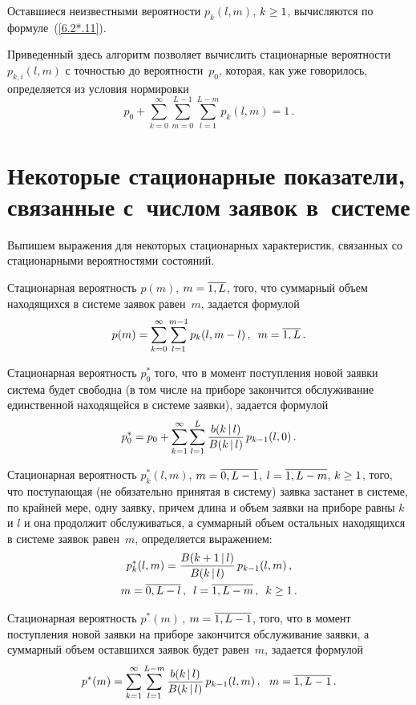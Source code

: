 \begin{multicols}{2}
Оставшиеся неизвестными вероятности $p_{k}(l,m)$,
$k\hm\ge1$, вычисляются по формуле~(\ref{6.2*.11}).

Приведенный здесь алгоритм позволяет вы\-чис\-лить
стационарные вероятности $p_{k,i}(l,m)$ с точ\-ностью
до вероятности~$p_0$, которая, как уже говорилось,
определяется из условия нормировки
$$
p_0+ \sum\limits_{k=0}^{\infty} \sum\limits_{m=0}^{L-1}
\sum\limits_{l=1}^{L-m} p_{k}(l,m)
= 1 \,.
$$

\section{Некоторые стационарные показатели,
связанные с~числом заявок в~системе}

Выпишем выражения для некоторых стационарных
характеристик, связанных со стационарными
вероятностями со\-сто\-яний.

Стационарная вероятность $p(m)$, $m\hm= \overline{1,L}$,
того, что суммарный объем находящихся в сис\-те\-ме заявок
равен~$m$, задается формулой
\begin{equation*}
p(m)= \sum\limits_{k=0}^{\infty} \sum\limits_{l=1}^{m-1}
p_{k}(l,m-l)\,,
\enskip m= \overline{1,L}\,.
\end{equation*}

Стационарная вероятность $p^*_{0}$ того, что в момент
поступления новой заявки система будет свободна (в том
числе на приборе закончится обслуживание единственной
находящейся в сис\-те\-ме заявки), задается формулой
\begin{equation*}
p^*_{0} = p_0 + \sum\limits_{k=1}^\infty \sum\limits_{l=1}^{L}
\displaystyle\frac{\displaystyle b(k\,|\,l)\mathstrut}{\displaystyle  B(k\,|\,l)\mathstrut} \, p_{k-1}(l,0) \,.
\end{equation*}

Стационарная вероятность
$p^*_{k}(l,m)$, $m\hm= \overline{0,L-1}$,
$l\hm= \overline{1,L-m}$, $k\hm\ge 1$,
того, что поступающая (не обязательно принятая в сис\-те\-му)
заявка застанет в сис\-те\-ме, по крайней мере, одну заявку,
причем длина и объем заявки на приборе равны $k$ и $l$
и она продолжит обслуживаться, а суммарный
объем остальных находящихся в сис\-те\-ме заявок равен~$m$,
определяется выражением:
\begin{multline*}
p^*_{k}(l,m)= \displaystyle\frac{\displaystyle B(k+1\,|\,l)\mathstrut}{\displaystyle B(k\,|\,l)\mathstrut}
\, p_{k-1}(l,m)\,,\\
m= \overline{0,L-l}\,,
\enskip
 l= \overline{1,L-m}\,,
\enskip  k\ge 1\,.
\end{multline*}

Стационарная вероятность
$p^*(m)$\,, $m\hm= \overline{1,L-1}$,
того, что в момент поступления новой заявки на приборе
закончится обслуживание заявки, а суммарный объем
оставшихся заявок будет равен~$m$, задается формулой
\begin{equation*}
p^*(m)= \sum\limits_{k=1}^\infty \sum\limits_{l=1}^{L-m}
\displaystyle\frac{\displaystyle b(k\,|\,l)\mathstrut}{\displaystyle  B(k\,|\,l)\mathstrut} \, p_{k-1}(l,m)\,,
\ \ m= \overline{1,L-1}\,.
\end{equation*}


\end{multicols}
